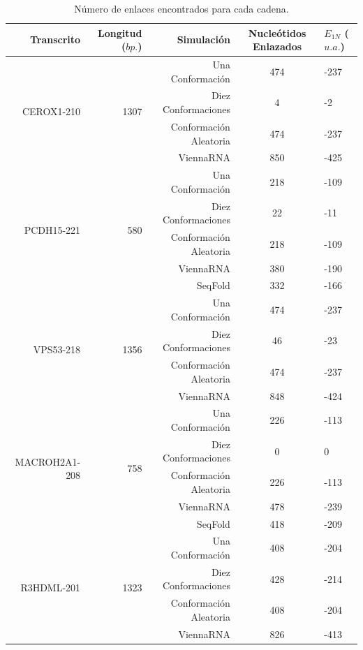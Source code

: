 \documentclass[a4paper,11pt,titlepage]{article}
\theoremstyle{definition}
\begin{document}
\begin{table}[H]
	\centering
    \begin{adjustbox}{width=0.75\textwidth}
	\begin{tabular}{rrrcl}
	    \toprule
        Transcrito & Longitud ($bp.$) & Simulación & Nucleótidos Enlazados & $E_{1N}$ ($u.a.$) \\
		\midrule
        \multirow{4}{*}{CEROX1-210} & \multirow{4}{*}{1307} & Una Conformación & 474 & -237 \\
        &  & Diez Conformaciones & 4 & -2 \\
        &  & Conformación Aleatoria & 474 & -237 \\
        &  & ViennaRNA & 850 & -425 \\
        \midrule
        \multirow{5}{*}{PCDH15-221} & \multirow{5}{*}{580} & Una Conformación & 218 & -109 \\
        &  & Diez Conformaciones & 22 & -11 \\
        &  & Conformación Aleatoria & 218 & -109 \\
        &  & ViennaRNA & 380 & -190 \\
        &  & SeqFold & 332 & -166 \\
        \midrule
        \multirow{4}{*}{VPS53-218} & \multirow{4}{*}{1356} & Una Conformación & 474 & -237 \\
        &  & Diez Conformaciones & 46 & -23 \\
        &  & Conformación Aleatoria & 474 & -237 \\
        &  & ViennaRNA & 848 & -424 \\
        \midrule
        \multirow{5}{*}{MACROH2A1-208} & \multirow{5}{*}{758} & Una Conformación & 226 & -113 \\
        &  & Diez Conformaciones & 0 & 0 \\
        &  & Conformación Aleatoria & 226 & -113 \\
        &  & ViennaRNA & 478 & -239 \\
        &  & SeqFold & 418 & -209 \\
        \midrule
        \multirow{4}{*}{R3HDML-201} & \multirow{4}{*}{1323} & Una Conformación & 408 & -204 \\
        &  & Diez Conformaciones & 428 & -214 \\
        &  & Conformación Aleatoria & 408 & -204 \\
        &  & ViennaRNA & 826 & -413 \\
		\bottomrule
	\end{tabular}
    \end{adjustbox}
	\caption{Número de enlaces encontrados para cada cadena.}
    \label{tab:linking}
\end{table}
\end{document}
